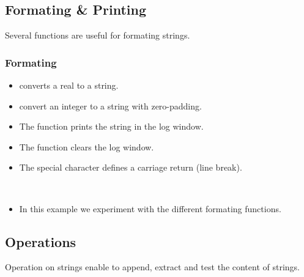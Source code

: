 \subsection{Formating \& Printing}

Several functions are useful for formating strings.

\begin{frame}[fragile]
  \frametitle<presentation>{Formating}
  \begin{itemize}
  \item {} converts a real to a string.
  \item {} convert an integer to a string with zero-padding.
  \item The function  prints the string in the log window.
  \item The function  clears the log window.
  \item The special character  defines a carriage return (line break).
  \end{itemize}
\end{frame}

\begin{frame}[fragile]
  \begin{example}~\par
    \begin{itemize}
    \item In this example we experiment with the different formating
      functions.~\par
      
    \end{itemize}
  \end{example}
\end{frame}

\subsection{Operations}

Operation on strings enable to append, extract and test the content of strings.

